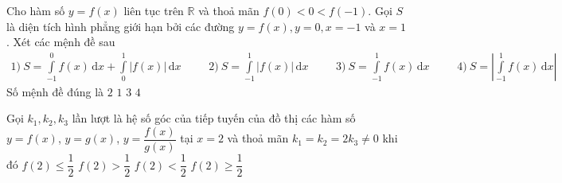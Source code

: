 \begin{ex}
Cho hàm số $ y = f(x) $	liên tục trên $ \mathbb{R} $ và thoả mãn $ f(0) < 0 < f(-1) $. Gọi $ S $ là diện tích hình phẳng giới hạn bởi các đường $ y = f(x), y = 0, x = -1 $ và $ x = 1 $. Xét các mệnh đề sau\\
$
\begin{aligned} 1) \ S = \displaystyle \int \limits^0_{-1} f(x) \mathrm{\, d}x + \int \limits^1_0 |f(x)| \mathrm{\, d}x \phantom{m} && 2) \ S = \displaystyle \int \limits^1_{-1} |f(x)| \mathrm{\, d}x \phantom{m} && 3) \ S = \displaystyle \int \limits^1_{-1} f(x) \mathrm{\, d}x \phantom{m} && 4) \ \displaystyle S = \left | \int \limits^1_{-1} f(x) \mathrm{\, d}x \right | 
\end{aligned}
$ 
Số mệnh đề đúng là
	\choice
	{$ 2 $}
	{\True $ 1 $}
	{$ 3 $}
	{$ 4 $}
\end{ex}	
\begin{ex}
Gọi $ k_1, k_2, k_3 $ lần lượt là hệ số góc của tiếp tuyến của đồ thị các hàm số $ y  = f(x)$, $ y = g(x) $, $y = \dfrac{f(x)}{g(x)} $ tại $ x = 2 $ và thoả mãn $ k_1 = k_2 = 2k_3 \neq 0 $ khi đó	
	\choice
	{\True $ f(2) \leq \dfrac{1}{2} $}
	{$ f(2) > \dfrac{1}{2} $}
	{$ f(2) < \dfrac{1}{2} $}
	{$ f(2) \geq \dfrac{1}{2} $}
\end{ex}	
